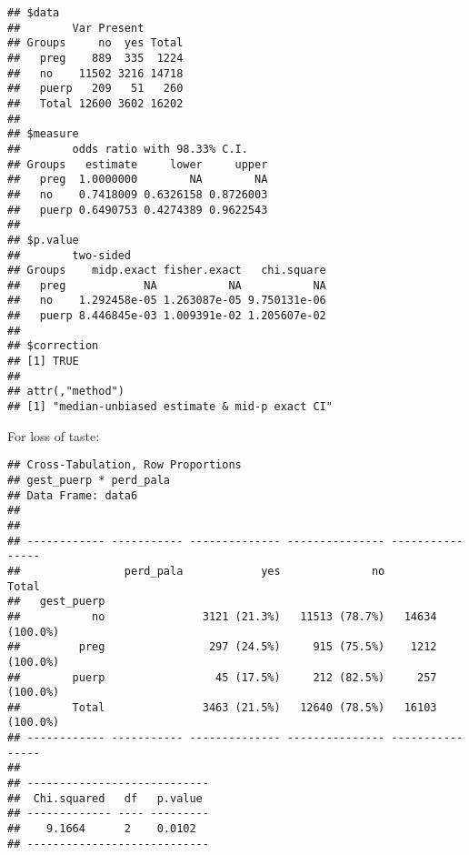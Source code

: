 \documentclass[
]{article}
\newenvironment{Shaded}{\begin{snugshade}}{\end{snugshade}}
\newcommand{\DataTypeTok}[1]{\textcolor[rgb]{0.13,0.29,0.53}{#1}}
\newcommand{\KeywordTok}[1]{\textcolor[rgb]{0.13,0.29,0.53}{\textbf{#1}}}
\newcommand{\NormalTok}[1]{#1}
\newcommand{\OperatorTok}[1]{\textcolor[rgb]{0.81,0.36,0.00}{\textbf{#1}}}
\newcommand{\OtherTok}[1]{\textcolor[rgb]{0.56,0.35,0.01}{#1}}
\newcommand{\StringTok}[1]{\textcolor[rgb]{0.31,0.60,0.02}{#1}}
\begin{document}
\begin{verbatim}
## $data
##        Var Present
## Groups     no  yes Total
##   preg    889  335  1224
##   no    11502 3216 14718
##   puerp   209   51   260
##   Total 12600 3602 16202
## 
## $measure
##        odds ratio with 98.33% C.I.
## Groups   estimate     lower     upper
##   preg  1.0000000        NA        NA
##   no    0.7418009 0.6326158 0.8726003
##   puerp 0.6490753 0.4274389 0.9622543
## 
## $p.value
##        two-sided
## Groups    midp.exact fisher.exact   chi.square
##   preg            NA           NA           NA
##   no    1.292458e-05 1.263087e-05 9.750131e-06
##   puerp 8.446845e-03 1.009391e-02 1.205607e-02
## 
## $correction
## [1] TRUE
## 
## attr(,"method")
## [1] "median-unbiased estimate & mid-p exact CI"
\end{verbatim}

For loss of taste:

\begin{Shaded}
\end{Shaded}

\begin{verbatim}
## Cross-Tabulation, Row Proportions  
## gest_puerp * perd_pala  
## Data Frame: data6  
## 
## 
## ------------ ----------- -------------- --------------- ----------------
##                perd_pala            yes              no            Total
##   gest_puerp                                                            
##           no               3121 (21.3%)   11513 (78.7%)   14634 (100.0%)
##         preg                297 (24.5%)     915 (75.5%)    1212 (100.0%)
##        puerp                 45 (17.5%)     212 (82.5%)     257 (100.0%)
##        Total               3463 (21.5%)   12640 (78.5%)   16103 (100.0%)
## ------------ ----------- -------------- --------------- ----------------
## 
## ----------------------------
##  Chi.squared   df   p.value 
## ------------- ---- ---------
##    9.1664      2    0.0102  
## ----------------------------
\end{verbatim}

\begin{Shaded}
\end{Shaded}
\end{document}
